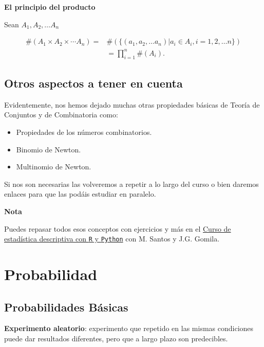\documentclass[
  letterpaper,
  DIV=11,
  numbers=noendperiod]{scrreprt}
\providecommand{\tightlist}{%
  \setlength{\itemsep}{0pt}\setlength{\parskip}{0pt}}\usepackage{longtable,booktabs,array}
\begin{document}
\textbf{El principio del producto}

Sean \(A_1,A_2,\ldots A_n\)

\[
\begin{array}{ll}
\#(A_1\times A_2\times \cdots A_n)=&\#\left(\{(a_1,a_2,\ldots a_n)| a_i\in A_i, i=1,2,\ldots n\}\right)\\
&=\prod_{i=1}^n \#(A_i).
\end{array}
\]

\hypertarget{otros-aspectos-a-tener-en-cuenta}{%
\section{Otros aspectos a tener en
cuenta}\label{otros-aspectos-a-tener-en-cuenta}}

Evidentemente, nos hemos dejado muchas otras propiedades básicas de
Teoría de Conjuntos y de Combinatoria como:

\begin{itemize}
\tightlist
\item
  Propiedades de los números combinatorios.
\item
  Binomio de Newton.
\item
  Multinomio de Newton.
\end{itemize}

Si nos son necesarias las volveremos a repetir a lo largo del curso o
bien daremos enlaces para que las podáis estudiar en paralelo.

\textbf{Nota}

Puedes repasar todos esos conceptos con ejercicios y más en el
\href{https://www.udemy.com/course/estadistica-descriptiva?couponCode=JB_PROMO_OFF}{Curso
de estadística descriptiva con \texttt{R} y \texttt{Python}} con M.
Santos y J.G. Gomila.


\hypertarget{probabilidad}{%
\chapter{Probabilidad}\label{probabilidad}}

\hypertarget{probabilidades-buxe1sicas}{%
\section{Probabilidades Básicas}\label{probabilidades-buxe1sicas}}

\textbf{Experimento aleatorio}: experimento que repetido en las mismas
condiciones puede dar resultados diferentes, pero que a largo plazo son
predecibles.
\end{document}

